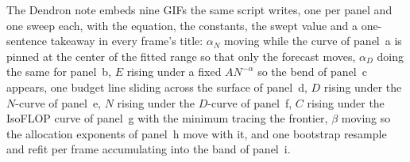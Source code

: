 The Dendron note
 embeds nine
GIFs the same script writes, one per panel and one sweep each, with the equation,
the constants, the swept value and a one-sentence takeaway in every frame's title:
$\alpha_N$ moving while the curve of panel~a is pinned at the center of the fitted
range so that only the forecast moves, $\alpha_D$ doing the same for panel~b, $E$
rising under a fixed $AN^{-\alpha}$ so the bend of panel~c appears, one budget line
sliding across the surface of panel~d, $D$ rising under the $N$-curve of panel~e,
$N$ rising under the $D$-curve of panel~f, $C$ rising under the IsoFLOP curve of
panel~g with the minimum tracing the frontier, $\beta$ moving so the allocation
exponents of panel~h move with it, and one bootstrap resample and refit per frame
accumulating into the band of panel~i.
